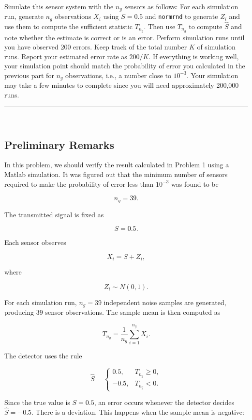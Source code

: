 \documentclass[12pt,a4paper]{article}
\begin{document}
\

\noindent Simulate this sensor system with the $n_g$ sensors as follows: For each simulation run, generate $n_g$ observations $X_i$ using $S = 0.5$ and \texttt{normrnd} to generate $Z_i$ and use them to compute the sufficient statistic $T_{n_g}$. Then use $T_{n_g}$ to compute $\hat{S}$ and note whether the estimate is correct or is an error. Perform simulation runs until you have observed 200 errors. Keep track of the total number $K$ of simulation runs. Report your estimated error rate as $200/K$. If everything is working well, your simulation point should match the probability of error you calculated in the previous part for $n_g$ observations, i.e., a number close to $10^{-3}$. Your simulation may take a few minutes to complete since you will need approximately 200{,}000 runs.\\

\hrule
 
\

\subsection{Preliminary Remarks}
In this problem, we should verify the result calculated in Problem 1 using a Matlab simulation. It was figured out that the minimum number of sensors required to make the probability of error less than $10^{-3}$ was found to be

\[
n_g = 39.
\]

The transmitted signal is fixed as

\[
S = 0.5.
\]

Each sensor observes

\[
X_i = S + Z_i,
\]

where

\[
Z_i \sim N(0,1).
\]

For each simulation run, \(n_g=39\) independent noise samples are generated, producing \(39\) sensor observations. The sample mean is then computed as

\[
T_{n_g} = \frac{1}{n_g}\sum_{i=1}^{n_g} X_i.
\]

The detector uses the rule

\[
\hat{S} =
\begin{cases}
0.5, & T_{n_g} \geq 0,\\
-0.5, & T_{n_g} < 0.
\end{cases}
\]

Since the true value is \(S=0.5\), an error occurs whenever the detector decides \(\hat{S}=-0.5\). There is a deviation. This happens when the sample mean is negative:
\end{document}

